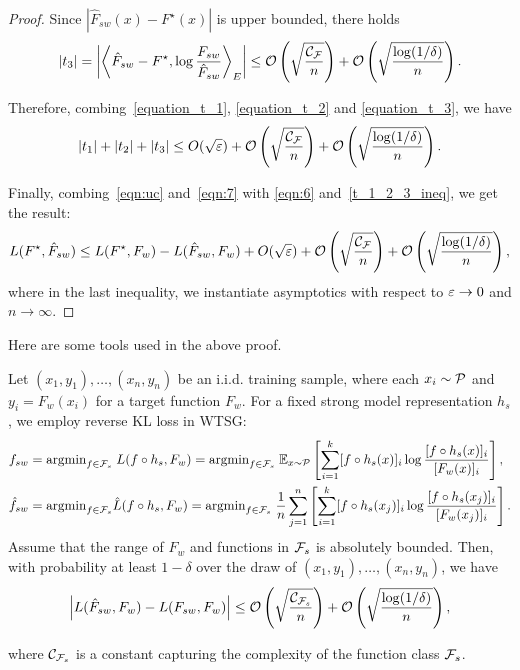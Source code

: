 \begin{proof}
Since $|\hat{F}_{sw}(x)-F^\star(x)|$ is upper bounded, there holds
\begin{align} \label{equation_t_3}
    |t_3| = \left| \left \langle \hat{F}_{sw}-F^\star, \log \frac{F_{sw}}{\hat{F}_{sw}} \right \rangle_E \right| \le \mathcal{O}\left(\sqrt{\frac{\mathcal{C}_{\mathcal{F}}}{n}}\right) + \mathcal{O}\left(\sqrt{\frac{\log(1/\delta)}{n}}\right).
\end{align}


Therefore, combing~\eqref{equation_t_1}, \eqref{equation_t_2} and \eqref{equation_t_3}, we have
\begin{align} \label{t_1_2_3_ineq}
    |t_1| + |t_2| + |t_3| \le O(\sqrt{\varepsilon}) + \mathcal{O}\left(\sqrt{\frac{\mathcal{C}_{\mathcal{F}}}{n}}\right) + \mathcal{O}\left(\sqrt{\frac{\log(1/\delta)}{n}}\right).
\end{align}


Finally, combing~\eqref{eqn:uc} and~\eqref{eqn:7} with \eqref{eqn:6} and~\eqref{t_1_2_3_ineq}, we get the result:
\begin{align*}
L(F^\star, \hat{F}_{sw}) \le L(F^\star, F_w) - L(\hat{F}_{sw}, F_w) + O(\sqrt{\varepsilon}) + \mathcal{O}\left(\sqrt{\frac{\mathcal{C}_{\mathcal{F}}}{n}}\right) + \mathcal{O}\left(\sqrt{\frac{\log(1/\delta)}{n}}\right),
\end{align*}
where in the last inequality, we instantiate asymptotics with respect to $\varepsilon \to 0$ and $n \to \infty$.

\end{proof}






Here are some tools used in the above proof.

\begin{lemma}
\label{lem:uniform-convergence}
Let $(x_1,y_1),\dots,(x_n, y_n)$ be an i.i.d. training sample, where each $x_i \sim \mathcal{P}$ and $y_i = F_w(x_i)$ for a target function $F_w$. For a fixed strong model representation $h_s$, we employ reverse KL loss in WTSG:
\begin{align*}
    & f_{sw} = \text{argmin}_{f \in \mathcal{F}_{s}}\; L(f \circ h_s, F_w) = \text{argmin}_{f \in \mathcal{F}_{s}} \; \mathbb{E}_{x \sim \mathcal{P}} \left[ \sum_{i=1}^k [f \circ h_s(x)]_i \log \frac{[f \circ h_s(x)]_i}{[F_w(x)]_i} \right],
    \\ & \hat{f}_{sw} = \text{argmin}_{f \in \mathcal{F}_s} \hat{L}(f \circ h_s, F_w) = \text{argmin}_{f \in \mathcal{F}_{s}} \; \frac{1}{n} \sum_{j=1}^n \left[ \sum_{i=1}^k [f \circ h_s(x_j)]_i \log \frac{[f \circ h_s(x_j)]_i}{[F_w(x_j)]_i} \right].
\end{align*}
Assume that the range of $F_w$ and functions in $\mathcal{F}_s$ is absolutely bounded. Then, with probability at least $1-\delta$ over the draw of $(x_1,y_1),\dots,(x_n, y_n)$, we have
\begin{align*}
    \left|L(\hat{F}_{sw}, F_w) - L(F_{sw}, F_w) \right| \le \mathcal{O}\left(\sqrt{\frac{\mathcal{C}_{\mathcal{F}_s}}{n}}\right) + \mathcal{O}\left(\sqrt{\frac{\log(1/\delta)}{n}}\right),
\end{align*}
\end{lemma}
where $\mathcal{C}_{\mathcal{F}_s}$ is a constant capturing the complexity of the function class $\mathcal{F}_s$.

